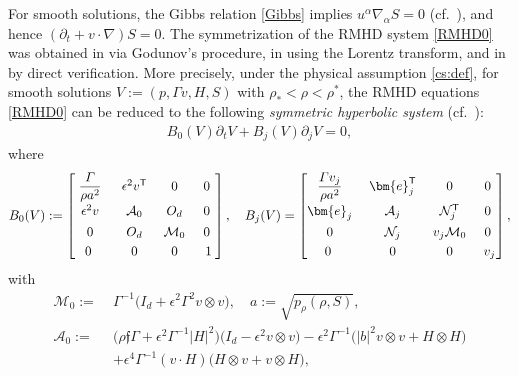 \documentclass[twoside,11pt]{article}
\numberwithin{equation}{section}
\def\p{\partial}
\newcommand\w[1]{\makebox[1em]{$#1$}}
\begin{document}
For smooth solutions, the Gibbs relation \eqref{Gibbs} implies $u^{\alpha} \nabla_{\alpha} S=0$ (cf.~\cite[\S 34]{Lichnerowicz67}), and hence $(\p_t +v\cdot \nabla) S=0$.
{The symmetrization of the RMHD system \eqref{RMHD0} was obtained in \cite{RS81MR0628566,A90zbMATH05040442,AP87MR0877994} via Godunov's procedure, in \cite{FT13MR3044369} using the Lorentz transform, and in \cite{TW21MR4201624} by direct verification.}
More precisely,
under the physical assumption \eqref{cs:def},
for smooth solutions $V:=(p,\varGamma v,H,S)$ with $\rho_*<\rho<\rho^*$,
the RMHD equations \eqref{RMHD0} can be reduced to the following {\it symmetric hyperbolic system} (cf.~\cite[(5.10)]{TW21MR4201624}):
\begin{align}\label{RMHD.vec}
	B_0(V)\p_t V+%
	B_j(V)\p_j V=0,
\end{align}
where
\begin{align} \label{B.def}
	B_0(V):=
	\begin{bmatrix}
		\;\dfrac{\varGamma}{\rho a^2}\;&\; \epsilon^2 v^{\mathsf{T}}\;& \;0\;&\; 0\;\\[2.5mm]
		\epsilon^2 v &\mathcal{A}_0&O_d& 0\\[1.5mm]
		0& O_d&\mathcal{M}_0&0\\[1mm]
		\w0\;&\;\w0\;&\;\w0\;&\;\w1
	\end{bmatrix},\quad
	B_j(V)=\begin{bmatrix}
		\;\dfrac{\varGamma v_j}{\rho a^2}\;
		& \;\bm{e}_j^{\mathsf{T}}\;& \;0\;& \;0\;\\[2.5mm]
		\bm{e}_j& \mathcal{A}_j & \mathcal{N}_j^{\mathsf{T}} & 0\\[1.5mm]
		0& \mathcal{N}_j & v_j\mathcal{M}_0 &0\\[1mm]
		\w0\;&\;\w0\;&\;\w0\;&\;\w{v_j}
	\end{bmatrix},
\end{align}
with
\begin{align} \label{M0.cal:def}
	\mathcal{M}_0:= \;&  \varGamma^{-1} \big(I_d+\epsilon^2\varGamma^2 v\otimes v\big) ,\quad a:=\sqrt{p_{\rho}(\rho,S)},	\\[0.5mm]
\nonumber	\mathcal{A}_0:=\;&
	\big(\rho \mathfrak{f}\varGamma+{\epsilon^2 \varGamma^{-1}|H|^2} \big)\big(I_d-\epsilon^2v\otimes v \big)
	- \epsilon^2 \varGamma^{-1} \big(|b|^2  v\otimes v+ H\otimes H\big)\\[0.5mm]
	&
	+ \epsilon^4 \varGamma^{-1}   (v\cdot H )\big(H\otimes v+v\otimes H\big),
	\nonumber
\end{align}	
\end{document}
